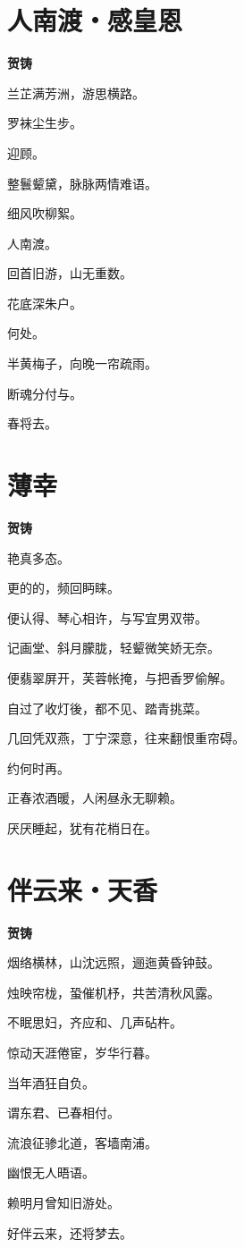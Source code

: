 \documentclass[12pt,a4paper]{ctexbook}
\begin{document}
\section{人南渡・感皇恩}
\textbf{贺铸}\par\vspace{0.5em}
兰芷满芳洲，游思横路。\par
罗袜尘生步。\par
迎顾。\par
整鬟颦黛，脉脉两情难语。\par
细风吹柳絮。\par
人南渡。\par
回首旧游，山无重数。\par
花底深朱户。\par
何处。\par
半黄梅子，向晚一帘疏雨。\par
断魂分付与。\par
春将去。\par

\section{薄幸}
\textbf{贺铸}\par\vspace{0.5em}
艳真多态。\par
更的的，频回眄睐。\par
便认得、琴心相许，与写宜男双带。\par
记画堂、斜月朦胧，轻颦微笑娇无奈。\par
便翡翠屏开，芙蓉帐掩，与把香罗偷解。\par
自过了收灯後，都不见、踏青挑菜。\par
几回凭双燕，丁宁深意，往来翻恨重帘碍。\par
约何时再。\par
正春浓酒暖，人闲昼永无聊赖。\par
厌厌睡起，犹有花梢日在。\par

\section{伴云来・天香}
\textbf{贺铸}\par\vspace{0.5em}
烟络横林，山沈远照，逦迤黄昏钟鼓。\par
烛映帘栊，蛩催机杼，共苦清秋风露。\par
不眠思妇，齐应和、几声砧杵。\par
惊动天涯倦宦，岁华行暮。\par
当年酒狂自负。\par
谓东君、已春相付。\par
流浪征骖北道，客墙南浦。\par
幽恨无人晤语。\par
赖明月曾知旧游处。\par
好伴云来，还将梦去。\par
\end{document}

